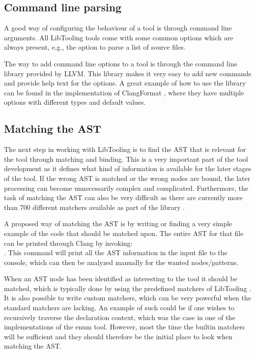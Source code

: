 \subsection{Command line parsing} \label{subsec:080dev:CMDLineParsing}

A good way of configuring the behaviour of a tool is through command line arguments. All LibTooling tools come with some common options which are always present, e.g., the option to parse a list of source files.

The way to add command line options to a tool is through the command line library provided by LLVM. This library makes it very easy to add new commands and provide help text for the options. A great example of how to use the library can be found in the implementation of ClangFormat \cite{llvmClangFormatClangFormat2023}, where they have multiple options with different types and default values.

\subsection{Matching the AST} \label{subsec:080dev:ASTNodeMatching}

The next step in working with LibTooling is to find the AST that is relevant for the tool through matching and binding. This is a very important part of the tool development as it defines what kind of information is available for the later stages of the tool. If the wrong AST is matched or the wrong nodes are bound, the later processing can become unnecessarily complex and complicated. Furthermore, the task of matching the AST can also be very difficult as there are currently more than 700 different matchers available as part of the library \cite{llvmASTMatcherReference}. 

A proposed way of matching the AST is by writing or finding a very simple example of the code that should be matched upon. The entire AST for that file can be printed through Clang by invoking:\\ . 
This command will print all the AST information in the input file to the console, which can then be analyzed manually for the wanted nodes/patterns.

When an AST node has been identified as interesting to the tool it should be matched, which is typically done by using the predefined matchers of LibTooling \cite{llvmASTMatcherReference}.
It is also possible to write custom matchers, which can be very powerful when the standard matchers are lacking. An example of such could be if one wishes to recursively traverse the declaration context, which was the case in one of the implementations of the enum tool.
However, most the time the builtin matchers will be sufficient and they should therefore be the initial place to look when matching the AST.

